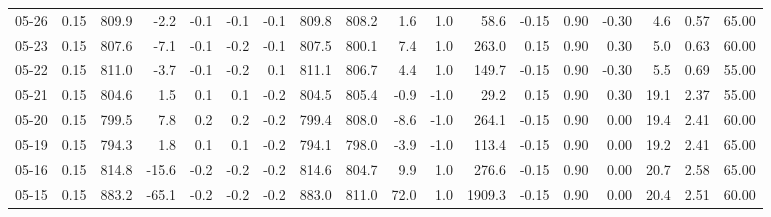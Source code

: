\begin{threeparttable}
{\begin{tabular}{lrrrrrrrrrrrrrrrrr}
  05-26 &     0.15 & 809.9 &              -2.2 &              -0.1 &               -0.1 &               -0.1 & 809.8 & 808.2 &        1.6 &                      1.0 &                58.6 &      -0.15 &      0.90 &          -0.30 &              4.6 &            0.57 &                  65.00 \\
  05-23 &     0.15 & 807.6 &              -7.1 &              -0.1 &               -0.2 &               -0.1 & 807.5 & 800.1 &        7.4 &                      1.0 &               263.0 &       0.15 &      0.90 &           0.30 &              5.0 &            0.63 &                  60.00 \\
  05-22 &     0.15 & 811.0 &              -3.7 &              -0.1 &               -0.2 &                0.1 & 811.1 & 806.7 &        4.4 &                      1.0 &               149.7 &      -0.15 &      0.90 &          -0.30 &              5.5 &            0.69 &                  55.00 \\
  05-21 &     0.15 & 804.6 &               1.5 &               0.1 &                0.1 &               -0.2 & 804.5 & 805.4 &       -0.9 &                     -1.0 &                29.2 &       0.15 &      0.90 &           0.30 &             19.1 &            2.37 &                  55.00 \\
  05-20 &     0.15 & 799.5 &               7.8 &               0.2 &                0.2 &               -0.2 & 799.4 & 808.0 &       -8.6 &                     -1.0 &               264.1 &      -0.15 &      0.90 &           0.00 &             19.4 &            2.41 &                  60.00 \\
  05-19 &     0.15 & 794.3 &               1.8 &               0.1 &                0.1 &               -0.2 & 794.1 & 798.0 &       -3.9 &                     -1.0 &               113.4 &      -0.15 &      0.90 &           0.00 &             19.2 &            2.41 &                  65.00 \\
  05-16 &     0.15 & 814.8 &             -15.6 &              -0.2 &               -0.2 &               -0.2 & 814.6 & 804.7 &        9.9 &                      1.0 &               276.6 &      -0.15 &      0.90 &           0.00 &             20.7 &            2.58 &                  65.00 \\
  05-15 &     0.15 & 883.2 &             -65.1 &              -0.2 &               -0.2 &               -0.2 & 883.0 & 811.0 &       72.0 &                      1.0 &              1909.3 &      -0.15 &      0.90 &           0.00 &             20.4 &            2.51 &                  60.00 \\

\end{tabular}}
\end{threeparttable}
